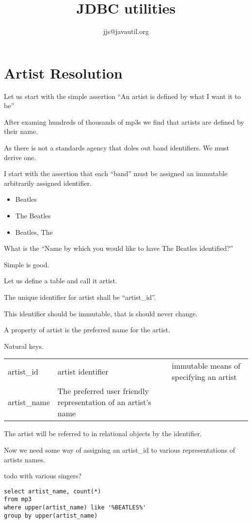 \documentclass[a4paper,10pt]{book}
\title{JDBC utilities}
\author{jjs@javautil.org}
\begin{document}
\chapter{Artist Resolution}
Let us start with the simple assertion ``An artist is defined by what I want it to be''

After examing hundreds of thousands of mp3s we find that artists are defined by their name.

As there is not a standards agency that doles out band identifiers. We must derive one.

I start with the assertion that each ``band'' must be assigned an immutable arbitrarily assigned identifier.

\begin{itemize}
 \item Beatles
 \item The Beatles
 \item Beatles, The  
\end{itemize}

What is the ``Name by which you would like to have The Beatles identified?''

Simple is good.

Let us define a table and call it artist.

The unique identifier for artist shall be ``artist_id''.

This identifier should be immutable, that is should never change.

A property of artist is the preferred name for the artist.

Natural keys.

\begin{tabular}{ l | l | l }
artist_id & artist identifier & immutable means of specifying an artist \\
artist_name & The preferred user friendly representation of an artist's name 
 
\end{tabular} 

The artist will be referred to in relational objects by the identifier.

Now we need some way of assigning an artist_id to various representations of artists names.


todo with various singers?
\begin{verbatim}
select artist_name, count(*) 
from mp3 
where upper(artist_name) like '%BEATLES%' 
group by upper(artist_name)
\end{verbatim}
\end{document}

